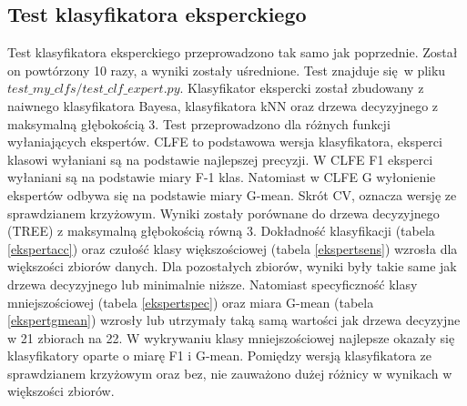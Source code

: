 \subsection{Test klasyfikatora eksperckiego}
Test klasyfikatora eksperckiego przeprowadzono tak samo jak poprzednie. Został on powtórzony 10 razy, a wyniki zostały uśrednione. Test znajduje się w pliku $test\_my\_clfs/test\_clf\_expert.py$. Klasyfikator ekspercki został zbudowany z naiwnego klasyfikatora Bayesa, klasyfikatora kNN oraz drzewa decyzyjnego z maksymalną głębokością 3. Test przeprowadzono dla różnych funkcji wyłaniających ekspertów. CLFE to podstawowa wersja klasyfikatora, eksperci klasowi wyłaniani są na podstawie najlepszej precyzji. W CLFE F1 eksperci wyłaniani są na podstawie miary F-1 klas. Natomiast w CLFE G wyłonienie ekspertów odbywa się na podstawie miary G-mean. Skrót CV, oznacza wersję ze sprawdzianem krzyżowym. Wyniki zostały porównane do drzewa decyzyjnego (TREE) z maksymalną głębokością równą 3. Dokładność klasyfikacji (tabela \ref{ekspertacc}) oraz czułość klasy większościowej (tabela \ref{ekspertsens}) wzrosła dla większości zbiorów danych. Dla pozostałych zbiorów, wyniki były takie same jak drzewa decyzyjnego lub minimalnie niższe. Natomiast specyficzność klasy mniejszościowej (tabela \ref{ekspertspec}) oraz miara G-mean (tabela \ref{ekspertgmean}) wzrosły lub utrzymały taką samą wartości jak drzewa decyzyjne w 21 zbiorach na 22. W wykrywaniu klasy mniejszościowej najlepsze okazały się klasyfikatory oparte o miarę F1 i G-mean. Pomiędzy wersją klasyfikatora ze sprawdzianem krzyżowym oraz bez, nie zauważono dużej różnicy w wynikach w większości zbiorów.
